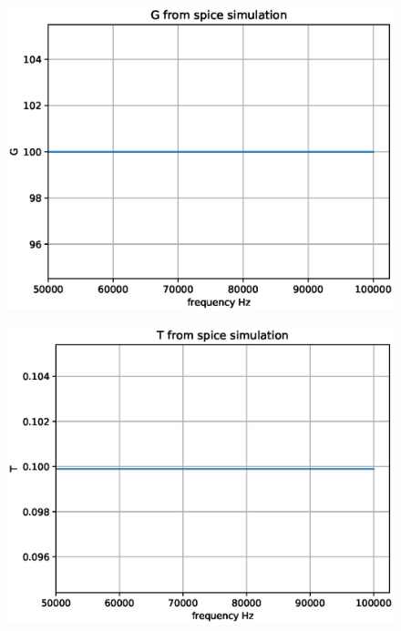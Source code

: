 \begin{enumerate}[label=\arabic*.,ref=\theenumi]
\begin{figure}[!ht]
\centering
\includegraphics[width=\columnwidth]{./figs/G.eps}
\caption{}
\label{fig:ee18btech11041_fig9}
\end{figure}


\begin{figure}[!ht]
\centering
\includegraphics[width=\columnwidth]{./figs/T.eps}
\caption{}
\label{fig:ee18btech11041_fig10}
\end{figure}


\end{enumerate}
